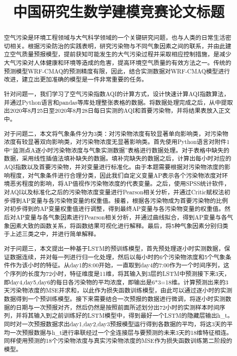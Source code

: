 \documentclass[bwprint]{gmcmthesis}
\title{中国研究生数学建模竞赛论文标题}
\numberwithin{figure}{section}
\begin{document}
 \maketitle
 \begin{abstract}
空气污染是环境工程领域与大气科学领域的一个关键研究问题，也与人类的日常生活密切相关。根据污染防治的实践表明，研究污染物与不同气象因素之间的联系，并由此建立空气质量预报模型，提前获知可能发生的大气污染过程并采取相应控制措施，是减少大气污染对人体健康和环境等造成的危害，提高环境空气质量的有效方法之一。传统的预测模型WRF-CMAQ的预测精度有限，因此，结合实测数据对WRF-CMAQ模型进行改进，建立出更加准确的模型是一件非常重要的任务。

针对问题一，我们学习了空气污染指数AQI的计算方式，设计快速计算AQI指数算法，并通过Python语言和pandas等库处理整张表格的数据。将数据处理完成之后，从中提取出2020年8月25日至2020年8月28日每日实测的AQI和首要污染物，并将结果表放入正文中。

对于问题二，本文将气象条件分为3类：对污染物浓度有较显著单向影响类，对污染物浓度有较显著双向影响类，对污染物浓度无显著影响类。首先使用Python语言对附件1中“监测点A逐小时污染物浓度与气象实测数据”表格进行数据处理。对于表格中缺失的数据，采用线性插值法填补缺失的数据。填补完缺失的数据之后，计算出每小时对应的AQI指数以及首要污染物，并对变量进行标准化。由于本题需要根据对污染物浓度的影响程度，对气象条件进行合理分类，因此我们自定义变量AP表示各个污染物浓度对环境恶劣程度的影响，将AP值视作污染物浓度的代表变量。之后，使用SPSS统计软件，对AQI以及标准化之后的污染物浓度变量进行Pearson相关分析，并通过Critic赋权法初步得到AP变量与各污染物变量的权重值。接着，根据各污染物成为首要污染物的比例对初步得到的AP变量权重值进行调整，得到最终AP变量与各污染物变量的权重值。然后对AP变量与各气象因素进行Pearson相关分析，并通过曲线拟合，得到AP变量与各气象因素大致的函数关系，将函数结果可视化进行解释。最后，将5种气象因素分别归类于上述三类之中，并进行简单解释。

对于问题三，本文提出一种基于LSTM的预训练模型，首先预处理逐小时实测数据，保证数据连续，并对每一列进行归一化处理，然后以每小时的6个污染物浓度和5个气象条件作为该小时的特征。从day1的8:00开始，一直取到day4的7:00作为一个时间序列，这个序列的长度为72小时，特征维度是11维，将其输入到3层的LSTM中预测接下来3天，即day4,day5,day6的每日各污染物的平均浓度，即输出是6*3=18维。计算预测出来的3天污染物浓度的MSE并求和，以此作为损失函数训练模型，由此可以通过逐小时的实测数据得到一个预训练模型。接下来需要结合一次预报的数据进行微调，将逐小时实测数据的日期与一次预报对齐，然后仍然是按照前面所述划分出72小时的实测样本时间序列，并将其输入到之前训练好的LSTM模型中，得到最好一个LSTM的隐藏层输出h_t。同时对一次预报数据求出day1,day2,day3预报模型运行得到各数据的平均，将这3天的平均一次预报数据与h_t进行串联经过一个全连接层与要预测的未来3天的18维特征相连。同样使用预测的18个污染物浓度与真实污染物浓度的MSE作为损失函数训练第二阶段的模型。


\end{abstract}
\end{document}
